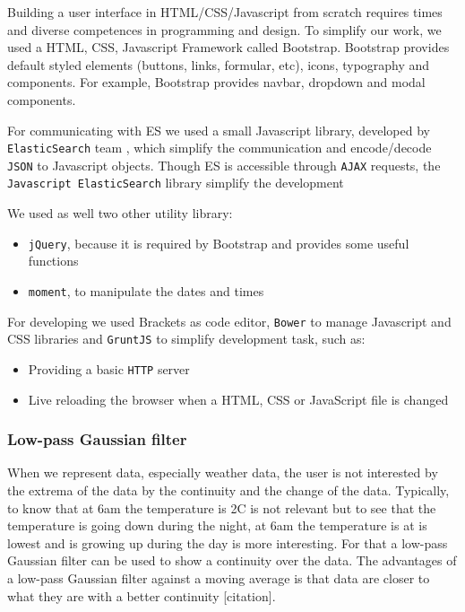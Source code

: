 \documentclass{acm_proc_article-sp}
\begin{document}
Building a user interface in HTML/CSS/Javascript from scratch requires times and diverse competences in programming and design. To simplify our work, we used a HTML, CSS, Javascript Framework called Bootstrap. Bootstrap provides default styled elements (buttons, links, formular, etc), icons, typography and components. For example, Bootstrap provides navbar, dropdown and modal components.

For communicating with ES we used a small Javascript library, developed by \texttt{ElasticSearch} team \cite{es_javascript}, which simplify the communication and encode/decode \texttt{JSON} to Javascript objects. Though ES is accessible through \texttt{AJAX} requests, the \texttt{Javascript ElasticSearch} library simplify the development

We used as well two other utility library:
\begin{itemize}
\item \texttt{jQuery}\cite{jquery}, because it is required by Bootstrap and provides some useful functions
\item \texttt{moment}\cite{moment}, to manipulate the dates and times
\end{itemize}

For developing we used Brackets as code editor, \texttt{Bower} to manage Javascript and CSS libraries and \texttt{GruntJS} to simplify development task, such as:
\begin{itemize}
 \item Providing a basic \texttt{HTTP} server 
 \item Live reloading the browser when a HTML, CSS or JavaScript file is changed
\end{itemize}

\subsubsection{Low-pass Gaussian filter}
When we represent data, especially weather data, the user is not interested by the extrema of the data by the continuity and the change of the data. Typically, to know that at 6am the temperature is 2\degree C is not relevant but to see that the temperature is going down during the night, at 6am the temperature is at is lowest and is growing up during the day is more interesting. For that a low-pass Gaussian filter can be used to show a continuity over the data. The advantages of a low-pass Gaussian filter against a moving average is that data are closer to what they are with a better continuity [citation].
\end{document}
